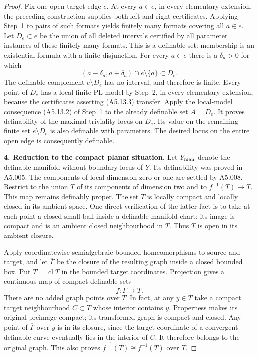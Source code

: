 \begin{proof}
Fix one open target edge $e$.  At every $a\in e$, in every
elementary extension, the preceding construction supplies both
left and right certificates.  Applying Step~1 to pairs of such
formats yields finitely many formats covering all $a\in e$.
Let $D_e\subset e$ be the union of all deleted intervals certified
by all parameter instances of these finitely many formats.
This is a definable set: membership is an existential formula
with a finite disjunction.  For every $a\in e$ there is a
$\delta_a>0$ for which
\[
       (a-\delta_a,a+\delta_a)\cap e\setminus\{a\}\subset D_e.
 \tag{A5.13.5}
\]
The definable complement $e\setminus D_e$ has no interval, and
therefore is finite.  Every point of $D_e$ has a local finite PL
model by Step~2, in every elementary extension, because the
certificates asserting (A5.13.3) transfer.  Apply the local-model
consequence (A5.13.2) of Step~1 to the already definable set
$A=D_e$.  It proves definability of the maximal triviality locus
on $D_e$.  Its value on the remaining finite set $e\setminus D_e$
is also definable with parameters.  The desired locus on the
entire open edge is consequently definable.

\medskip\noindent\textbf{4. Reduction to the compact planar situation.}
Let $Y_{\rm man}$ denote the definable manifold-without-boundary
locus of $Y$.  Its definability was proved in A5.005.  The
components of local dimension zero or one are settled by A5.008.
Restrict to the union $T$ of its components of dimension two and
to $f^{-1}(T)\to T$.  This map remains definably proper.  The
set $T$ is locally compact and locally closed in its ambient
space.  One direct verification of the latter fact is to take
at each point a closed small ball inside a definable manifold
chart; its image is compact and is an ambient closed
neighbourhood in $T$.  Thus $T$ is open in its ambient closure.

Apply coordinatewise semialgebraic bounded homeomorphisms to
source and target, and let $\overline\Gamma$ be the closure of
the resulting graph inside a closed bounded box.  Put
$\overline T=\operatorname{cl}T$ in the bounded target coordinates.
Projection gives a continuous map of compact definable sets
\[
          \overline f:\overline\Gamma\longrightarrow\overline T.
\]
There are no added graph points over $T$.  In fact, at any
$y\in T$ take a compact target neighbourhood $C\subset T$ whose
interior contains $y$.  Properness makes its original preimage
compact; its transformed graph is compact and closed.  Any
point of $\overline\Gamma$ over $y$ is in its closure, since the
target coordinate of a convergent definable curve eventually
lies in the interior of $C$.  It therefore belongs to the
original graph.  This also proves
$\overline f^{-1}(T)\cong f^{-1}(T)$ over $T$.


\end{proof}
